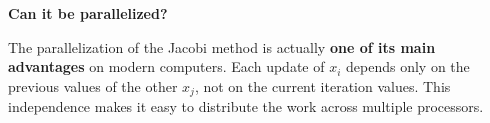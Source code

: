 \highspace
\begin{flushleft}
    \textcolor{Green3}{ \textbf{Can it be parallelized?}}
\end{flushleft}
The parallelization of the Jacobi method is actually \textbf{one of its main advantages} on modern computers. Each update of $x_{i}$ depends only on the previous values of the other $x_{j}$, not on the current iteration values. This independence makes it easy to distribute the work across multiple processors.

